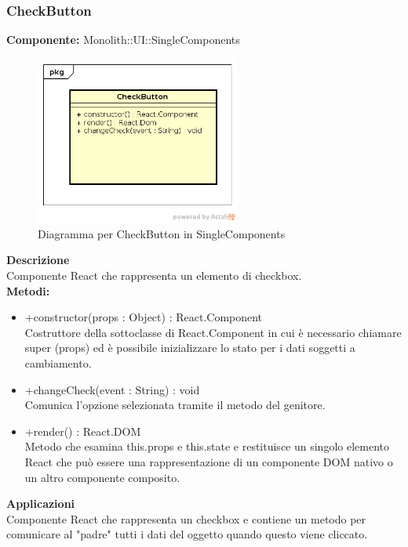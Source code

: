 \clearpage

\subsubsection{CheckButton}
\textbf{Componente:}  Monolith::UI::SingleComponents\\
   \FloatBarrier
   \begin{figure}[ht]
   \centering
   \includegraphics[width=0.6\textwidth]{img/single-CheckButton}
   \caption{{Diagramma per CheckButton in SingleComponents}}
\end{figure}
\FloatBarrier
\textbf{Descrizione}\\
Componente React che rappresenta un elemento di checkbox. \\
\textbf{Metodi:} 
\begin{itemize}

\item +constructor(props : Object) : React.Component 
\\
Costruttore della sottoclasse di React.Component in cui è necessario chiamare super (props) ed è possibile inizializzare lo stato per i dati soggetti a cambiamento.

\item +changeCheck(event : String) : void  
\\
Comunica l’opzione selezionata tramite il metodo del genitore. 

\item +render() : React.DOM 
\\
Metodo che esamina this.props e this.state e restituisce un singolo elemento React che può essere una rappresentazione di un componente DOM nativo o un altro componente composito.

\end{itemize} 


\textbf{Applicazioni}\\
Componente React che rappresenta un checkbox e contiene un metodo per comunicare al "padre" tutti i dati del oggetto quando questo viene cliccato. 


